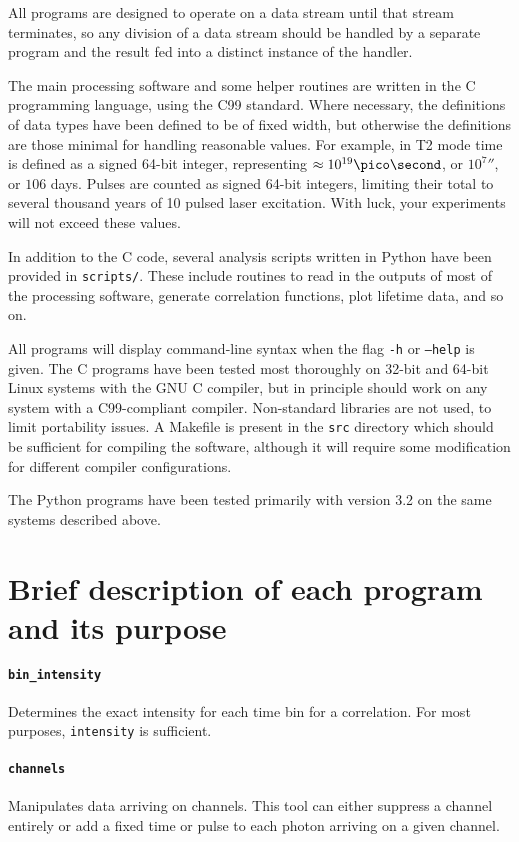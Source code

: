 \documentclass{book}
\newcommand{\program}[1]{\texttt{#1}}
\numberwithin{equation}{section}
\numberwithin{figure}{section}
\begin{document}
All programs are designed to operate on a data stream until that stream terminates, so any division of a data stream should be handled by a separate program and the result fed into a distinct instance of the handler. 

The main processing software and some helper routines are written in the C programming language, using the C99 standard. Where necessary, the definitions of data types have been defined to be of fixed width, but otherwise the definitions are those minimal for handling reasonable values. For example, in T2 mode time is defined as a signed 64-bit integer, representing $\approx 10^{19}\pico\second$, or $10^{7}\second$, or $106$ days. Pulses are counted as signed 64-bit integers, limiting their total to several thousand years of 10\mega\hertz{} pulsed laser excitation. With luck, your experiments will not exceed these values. 

In addition to the C code, several analysis scripts written in Python have been provided in \texttt{scripts/}. These include routines to read in the outputs of most of the processing software, generate correlation functions, plot lifetime data, and so on. 

All programs will display command-line syntax when the flag \texttt{-h} or \texttt{--help} is given. The C programs have been tested most thoroughly on 32-bit and 64-bit Linux systems with the GNU C compiler, but in principle should work on any system with a C99-compliant compiler. Non-standard libraries are not used, to limit portability issues. A Makefile is present in the \texttt{src} directory which should be sufficient for compiling the software, although it will require some modification for different compiler configurations.

The Python programs have been tested primarily with version 3.2 on the same systems described above.

\section{Brief description of each program and its purpose}
\paragraph{\program{bin\_intensity}}
Determines the exact intensity for each time bin for a correlation. For most purposes, \program{intensity} is sufficient.

\paragraph{\program{channels}}
Manipulates data arriving on channels. This tool can either suppress a channel entirely or add a fixed time or pulse to each photon arriving on a given channel.
\end{document}
